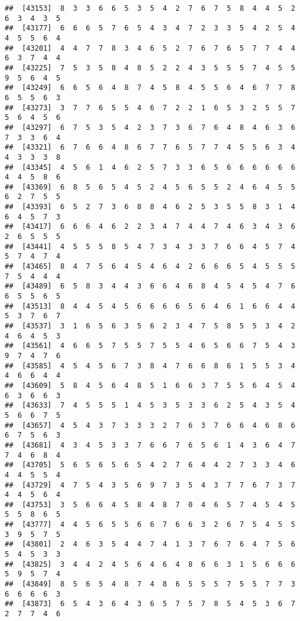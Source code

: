 \documentclass[
]{book}
\begin{document}
\begin{verbatim}
##  [43153]  8  3  3  6  6  5  3  5  4  2  7  6  7  5  8  4  4  5  2  6  3  4  3  5
##  [43177]  6  6  6  5  7  6  5  4  3  4  7  2  3  3  5  4  2  5  4  4  5  5  6  4
##  [43201]  4  4  7  7  8  3  4  6  5  2  7  6  7  6  5  7  7  4  4  6  3  7  4  4
##  [43225]  7  5  3  5  8  4  8  5  2  2  4  3  5  5  5  7  4  5  5  9  5  6  4  5
##  [43249]  6  6  5  6  4  8  7  4  5  8  4  5  5  6  4  6  7  7  8  6  5  5  6  3
##  [43273]  3  7  7  6  5  5  4  6  7  2  2  1  6  5  3  2  5  5  7  5  6  4  5  6
##  [43297]  6  7  5  3  5  4  2  3  7  3  6  7  6  4  8  4  6  3  6  7  3  3  6  4
##  [43321]  6  7  6  6  4  8  6  7  7  6  5  7  7  4  5  5  6  3  4  4  3  3  3  8
##  [43345]  4  5  6  1  4  6  2  5  7  3  3  6  5  6  6  6  6  6  6  4  4  5  8  6
##  [43369]  6  8  5  6  5  4  5  2  4  5  6  5  5  2  4  6  4  5  5  6  2  7  5  5
##  [43393]  6  5  2  7  3  6  8  8  4  6  2  5  3  5  5  8  3  1  4  6  4  5  7  3
##  [43417]  6  6  6  4  6  2  2  3  4  7  4  4  7  4  6  3  4  3  6  2  6  5  5  5
##  [43441]  4  5  5  5  8  5  4  7  3  4  3  3  7  6  6  4  5  7  4  5  7  4  7  4
##  [43465]  8  4  7  5  6  4  5  4  6  4  2  6  6  6  5  4  5  5  5  7  5  4  4  4
##  [43489]  6  5  8  3  4  4  3  6  6  4  6  8  4  5  4  5  4  7  6  6  5  5  6  5
##  [43513]  8  4  4  5  4  5  6  6  6  6  5  6  4  6  1  6  6  4  4  5  3  7  6  7
##  [43537]  3  1  6  5  6  3  5  6  2  3  4  7  5  8  5  5  3  4  2  4  6  4  5  3
##  [43561]  4  6  6  5  7  5  5  7  5  5  4  6  5  6  6  7  5  4  3  9  7  4  7  6
##  [43585]  4  5  4  5  6  7  3  8  4  7  6  6  8  6  1  5  5  3  4  4  6  6  4  4
##  [43609]  5  8  4  5  6  4  8  5  1  6  6  3  7  5  5  6  4  5  4  6  3  6  6  3
##  [43633]  7  4  5  5  5  1  4  5  3  5  3  3  6  2  5  4  3  5  4  5  6  6  7  5
##  [43657]  4  5  4  3  7  3  3  3  2  7  6  3  7  6  6  4  6  8  6  6  7  5  6  3
##  [43681]  4  3  4  5  3  3  7  6  6  7  6  5  6  1  4  3  6  4  7  7  4  6  8  4
##  [43705]  5  6  5  6  5  6  5  4  2  7  6  4  4  2  7  3  3  4  6  4  4  5  5  4
##  [43729]  4  7  5  4  3  5  6  9  7  3  5  4  3  7  7  6  7  3  7  4  4  5  6  4
##  [43753]  3  5  6  6  4  5  8  4  8  7  0  4  6  5  7  4  5  4  5  5  5  8  6  5
##  [43777]  4  4  5  6  5  5  6  6  7  6  6  3  2  6  7  5  4  5  5  3  9  5  7  5
##  [43801]  2  4  6  3  5  4  4  7  4  1  3  7  6  7  6  4  7  5  6  5  4  5  3  3
##  [43825]  3  4  4  2  4  5  6  4  6  4  8  6  6  3  1  5  6  6  6  5  9  5  7  4
##  [43849]  8  5  6  5  4  8  7  4  8  6  5  5  5  7  5  5  7  7  3  6  6  6  6  3
##  [43873]  6  5  4  3  6  4  3  6  5  7  5  7  8  5  4  5  3  6  7  2  7  7  4  6

\end{verbatim}
\end{document}

